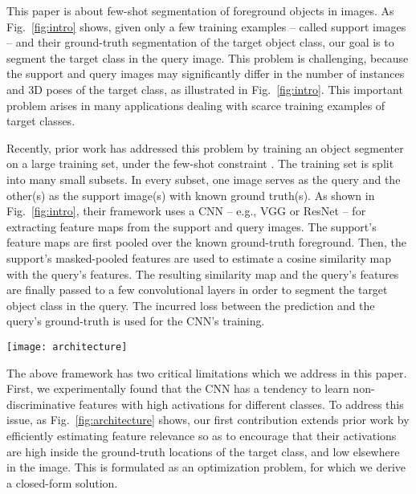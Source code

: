\documentclass[10pt,twocolumn,letterpaper]{article}
\begin{document}
 This paper is about few-shot segmentation of foreground objects in images. As  Fig.~\ref{fig:intro} shows, given only a few training examples -- called support images -- and their ground-truth segmentation of the target object class, our goal is to segment the target class in the query image. 
This problem is challenging, because the support and query images may significantly differ in the number of instances and 3D poses of the target class, as illustrated in Fig.~\ref{fig:intro}. This important problem arises in many applications dealing with scarce training examples of target classes. 
 
 


 Recently, prior work has addressed this problem by training an object segmenter on a large training set, under the few-shot constraint \cite{shaban2017one,dong2018few,rakelly2018conditional}. The training set is  split into many small subsets. In every subset, one image serves as the query and the other(s) as the support image(s) with known ground truth(s). As shown in Fig.~\ref{fig:intro}, their framework uses a CNN -- e.g.,  VGG \cite{simonyan2014deep} or ResNet \cite{he2015deep} -- for extracting feature maps from the support and query images. The support's feature maps are first pooled over the known ground-truth foreground. Then, the support's masked-pooled features are used to estimate a cosine similarity map with the query's features. The resulting similarity map and the query's features are finally passed to a few convolutional layers in order to segment the target object class in the query. The incurred loss between the prediction and the query's ground-truth is used for the CNN's training.
 
  
  
\begin{figure*}[h!]
    \centering
    \texttt{[image: architecture]}
    \caption{Our few-shot learning from a single support image: Prior work averages a class feature vector over the known foreground of the support image. A dot product of this class feature vector and feature maps of the query image gives a similarity map. The similarity map and features of the query image are used for segmenting the target class in the query. We extend prior work by additionally estimating feature relevance (contribution 1). Our contribution 2 is shown in Fig.~\ref{fig:test_phase}.}
    \label{fig:architecture}
\end{figure*}


The above framework has two critical limitations which we address in this paper. First, we experimentally found that the CNN has a tendency to learn non-discriminative features with high activations for different classes. To address this issue, as Fig.~\ref{fig:architecture} shows, our first contribution extends prior work by efficiently estimating feature relevance so as to encourage that their activations are high inside the ground-truth locations of the target class, and low elsewhere in the image. This is formulated as an optimization problem, for which we derive a closed-form solution.  
 
\end{document}
